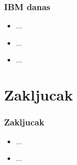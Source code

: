 \documentclass{beamer}
\begin{document}
\begin{frame}[fragile]\frametitle{IBM danas}
	\begin{itemize}	
		\item ...
		\item ...
		\item ...
	\end{itemize}
\end{frame}

\section{Zakljucak}

\begin{frame}[fragile]\frametitle{Zakljucak}
	\begin{itemize}	
		\item ...
		\item ...
	\end{itemize}
\end{frame}
\end{document}
